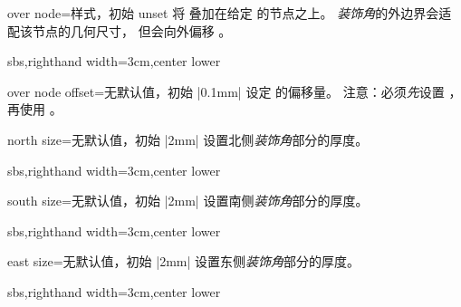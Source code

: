 \begin{vigTcbKey}[][doc new=2016-04-22]{over node}{=}{样式，初始 unset}
  将  叠加在给定  的节点之上。
  \emph{装饰角}的外边界会适配该节点的几何尺寸，
  但会向外偏移 。
\begin{dispExample*}{sbs,righthand width=3cm,center lower}
\end{dispExample*}
\end{vigTcbKey}

\begin{vigTcbKey}[][doc new=2016-04-22]{over node offset}{=}{无默认值，初始 |0.1mm|}
  设定  的偏移量。
  注意：必须\emph{先}设置 ，
  再使用 。
\end{vigTcbKey}


\begin{vigTcbKey}[][doc new=2016-04-22]{north size}{=}{无默认值，初始 |2mm|}
  设置北侧\emph{装饰角}部分的厚度。
\begin{dispExample*}{sbs,righthand width=3cm,center lower}
\end{dispExample*}
\end{vigTcbKey}

\begin{vigTcbKey}[][doc new=2016-04-22]{south size}{=}{无默认值，初始 |2mm|}
  设置南侧\emph{装饰角}部分的厚度。
\begin{dispExample*}{sbs,righthand width=3cm,center lower}
\end{dispExample*}
\end{vigTcbKey}

\begin{vigTcbKey}[][doc new=2016-04-22]{east size}{=}{无默认值，初始 |2mm|}
  设置东侧\emph{装饰角}部分的厚度。
\begin{dispExample*}{sbs,righthand width=3cm,center lower}
\end{dispExample*}
\end{vigTcbKey}

